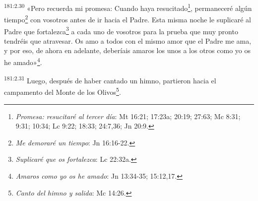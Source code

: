 \par 
\textsuperscript{181:2.30} «Pero recuerda mi promesa: Cuando haya resucitado\footnote{\textit{Promesa: resucitaré al tercer día}: Mt 16:21; 17:23a; 20:19; 27:63; Mc 8:31; 9:31; 10:34; Lc 9:22; 18:33; 24:7,36; Jn 20:9.}, permaneceré algún tiempo\footnote{\textit{Me demoraré un tiempo}: Jn 16:16-22.} con vosotros antes de ir hacia el Padre. Esta misma noche le suplicaré al Padre que fortalezca\footnote{\textit{Suplicaré que os fortalezca}: Lc 22:32a.} a cada uno de vosotros para la prueba que muy pronto tendréis que atravesar. Os amo a todos con el mismo amor que el Padre me ama, y por eso, de ahora en adelante, deberíais amaros los unos a los otros como yo os he amado»\footnote{\textit{Amaros como yo os he amado}: Jn 13:34-35; 15:12,17.}.

\par 
\textsuperscript{181:2.31} Luego, después de haber cantado un himno, partieron hacia el campamento del Monte de los Olivos\footnote{\textit{Canto del himno y salida}: Mc 14:26.}.